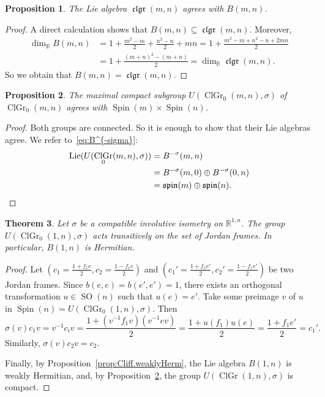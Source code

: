 \documentclass[a4paper,oneside,11pt]{amsart}
\DeclareMathOperator{\SO}{SO}
\DeclareMathOperator{\spin}{\mathfrak{spin}}
\DeclareMathOperator{\ClGr}{ClGr}
\DeclareMathOperator{\clgr}{\mathfrak{clgr}}
\DeclareMathOperator{\Lie}{Lie}
\DeclareMathOperator{\Spin}{Spin}
\newcommand{\R}{\mathbb R}
\theoremstyle{plain}
\newtheorem{teo}{Theorem}[section]
\newtheorem{prop}[teo]{Proposition}
\theoremstyle{definition}
\theoremstyle{remark}
\begin{document}
\begin{prop} The Lie algebra $\clgr(m,n)$ agrees with $B(m,n)$.
\end{prop}

\begin{proof}
A direct calculation shows that $B(m,n)\subseteq \clgr(m,n)$.
Moreover,
\begin{align*}
    \dim_{\R}B(m,n)&=1+\frac{m^2-m}{2}+\frac{n^2-n}{2}+mn=1+\frac{m^2-m+n^2-n+2mn}{2}\\
    &=1+\frac{(m+n)^2-(m+n)}{2}=\dim_{\R}\clgr(m,n).
\end{align*}
So we obtain that $B(m,n)=\clgr(m,n)$.
\end{proof}

\begin{prop}\label{U-Clif-Comp}
The maximal compact subgroup $U(\ClGr_0(m,n),\sigma)$ of $\ClGr_0(m,n)$ agrees with $\Spin(m)\times\Spin(n)$.
\end{prop}

\begin{proof} Both groups are connected. So it is enough to show that their Lie algebras agree. We refer to~\eqref{eq:B^{-sigma}}:
\begin{align*}
    \Lie(U(\ClGr_0(m,n),\sigma))&=B^{-\sigma}(m,n)\\
    &=B^{-\sigma}(m,0)\oplus B^{-\sigma}(0,n) \\
    &=\spin(m)\oplus\spin(n).\qedhere
\end{align*}
\end{proof}

\begin{teo} Let $\sigma$ be a compatible involutive isometry on $\R^{1,n}$. The group $U(\ClGr_0(1,n),\sigma)$ acts transitively on the set of Jordan frames. In particular, $B(1,n)$ is Hermitian.
\end{teo}

\begin{proof}
Let $\left(c_1=\frac{1+f_1e}{2},c_2=\frac{1-f_1e}{2}\right)$ and $\left(c_1'=\frac{1+f_1e'}{2}, c_2'=\frac{1-f_1e'}{2}\right)$ be two Jordan frames. Since $b(e,e)=b(e',e')=1$, there exists an orthogonal transformation $u\in \SO(n)$ such that $u(e)=e'$. Take some preimage $v$ of $u$ in $\Spin(n)=U(\ClGr_0(1,n),\sigma)$. Then
$$\sigma(v)c_1v=v^{-1}c_iv=\frac{1+(v^{-1}f_1v)(v^{-1}ev)}{2}=\frac{1+u(f_1)u(e)}{2}=\frac{1+f_1e'}{2}=c_1'.$$
Similarly, $\sigma(v)c_2v=c_2$.

Finally, by Proposition~\ref{prop:Cliff.weaklyHerm}, the Lie algebra $B(1,n)$ is weakly Hermitian, and, by Proposition~\ref{U-Clif-Comp}, the group $U(\ClGr(1,n),\sigma)$ is compact.
\end{proof}
\end{document}

